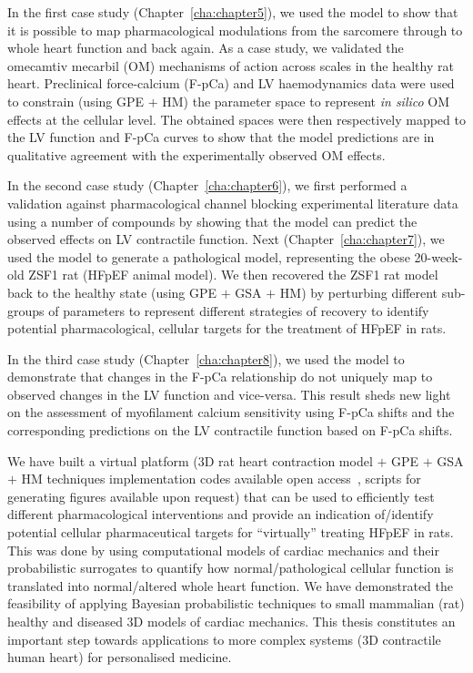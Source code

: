 \newpage
In the first case study (Chapter~\ref{cha:chapter5}), we used the model to show that it is possible to map pharmacological modulations from the sarcomere through to whole heart function and back again. As a case study, we validated the omecamtiv mecarbil (OM) mechanisms of action across scales in the healthy rat heart. Preclinical force-calcium (F-pCa) and LV haemodynamics data were used to constrain (using GPE $+$ HM) the parameter space to represent \textit{in silico} OM effects at the cellular level. The obtained spaces were then respectively mapped to the LV function and F-pCa curves to show that the model predictions are in qualitative agreement with the experimentally observed OM effects.

\vspace{0.2cm}
In the second case study (Chapter~\ref{cha:chapter6}), we first performed a validation against pharmacological channel blocking experimental literature data using a number of compounds by showing that the model can predict the observed effects on LV contractile function. Next (Chapter~\ref{cha:chapter7}), we used the model to generate a pathological model, representing the obese 20-week-old ZSF1 rat (HFpEF animal model). We then recovered the ZSF1 rat model back to the healthy state (using GPE $+$ GSA $+$ HM) by perturbing different sub-groups of parameters to represent different strategies of recovery to identify potential pharmacological, cellular targets for the treatment of HFpEF in rats.

\vspace{0.2cm}
In the third case study (Chapter~\ref{cha:chapter8}), we used the model to demonstrate that changes in the F-pCa relationship do not uniquely map to observed changes in the LV function and vice-versa. This result sheds new light on the assessment of myofilament calcium sensitivity using F-pCa shifts and the corresponding predictions on the LV contractile function based on F-pCa shifts.

\vspace{0.2cm}
We have built a virtual platform ($3$D rat heart contraction model $+$ GPE $+$ GSA $+$ HM techniques implementation codes available open access~\cite{zenodo:2021,Historia:2021,GPErks:2021}, scripts for generating figures available upon request) that can be used to efficiently test different pharmacological interventions and provide an indication of/identify potential cellular pharmaceutical targets for ``virtually'' treating HFpEF in rats. This was done by using computational models of cardiac mechanics and their probabilistic surrogates to quantify how normal/pathological cellular function is translated into normal/altered whole heart function. We have demonstrated the feasibility of applying Bayesian probabilistic techniques to small mammalian (rat) healthy and diseased $3$D models of cardiac mechanics. This thesis constitutes an important step towards applications to more complex systems ($3$D contractile human heart) for personalised medicine.

\vspace{0.2cm}


\endgroup

\vfill